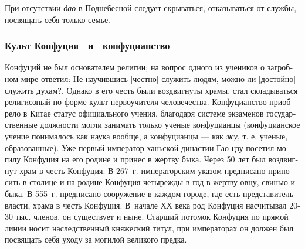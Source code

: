 \documentclass[twoside,a4paper]{article}
\begin{document}
{
При отсутствии \textit{дао} в Поднебесной следует {\textquotedbl}скрываться{\textquotedbl}, отказываться от службы,
посвящать себя только семье. }

\subsubsection[Культ Конфуция \ и \ конфуцианство ]{Культ Конфуция \ и \ конфуцианство }
{
\foreignlanguage{russian}{Конфуций не был основателем религии; на вопрос одного из учеников о загробном мире ответил:
{\textquotedbl}Не научившись [честно] служить людям, можно ли [достойно] служить духам?{\textquotedbl}. Однако в его
честь были воздвигнуты храмы, стал складываться религиозный по форме культ первоучителя человечества. Конфуцианство
приобрело в Китае статус официального учения, благодаря системе экзаменов государственные должности могли занимать
только ученые конфуцианцы (конфуцианское учение понималось как {\textquotedbl}наука{\textquotedbl} вообще, а
конфуцианцы — как {\textquotedbl}}\foreignlanguage{russian}{\textit{жу}}\foreignlanguage{russian}{{\textquotedbl}, т.
е. {\textquotedbl}ученые{\textquotedbl}, {\textquotedbl}образованные{\textquotedbl}). Уже первый император ханьской
династии Гао-цзу посетил могилу Конфуция на его родине и принес в жертву быка. Через 50 лет был воздвигнут храм в честь
Конфуция. В 267~г. императорским указом предписано приносить в столице и на родине Конфуция четырежды в год в жертву
овцу, свинью и быка. В 555~г. предписано сооружение в каждом городе, где есть представитель власти, храма в честь
Конфуция. В~начале ХХ века род Конфуция насчитывал 20-30 тыс. членов, он существует и ныне. Старший потомок Конфуция по
прямой линии носит наследственный княжеский титул, при императорах он должен был посвящать себя уходу за могилой
великого предка. }}
\end{document}
